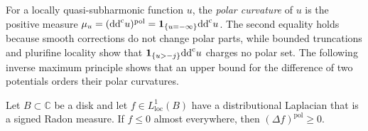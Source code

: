 For a locally quasi-subharmonic function $u$, the \emph{polar curvature} of $u$ is the positive measure $\mu_u=(\mathrm{dd}^{\mathrm{c}} u)^{\mathrm{pol}}=\mathbf1_{\{u=-\infty\}}\mathrm{dd}^{\mathrm{c}} u$. The second equality holds because smooth corrections do not change polar parts, while bounded truncations and plurifine locality show that $\mathbf1_{\{u>-j\}}\mathrm{dd}^{\mathrm{c}} u$ charges no polar set. The following inverse maximum principle shows that an upper bound for the difference of two potentials orders their polar curvatures.

\begin{lemma}\label{lem:planar-inverse-maximum}
Let $B\subset\mathbb C$ be a disk and let $f\in L^1_{\mathrm{loc}}(B)$ have a distributional Laplacian that is a signed Radon measure. If $f\leq0$ almost everywhere, then $(\Delta f)^{\mathrm{pol}}\geq0$.
\end{lemma}
